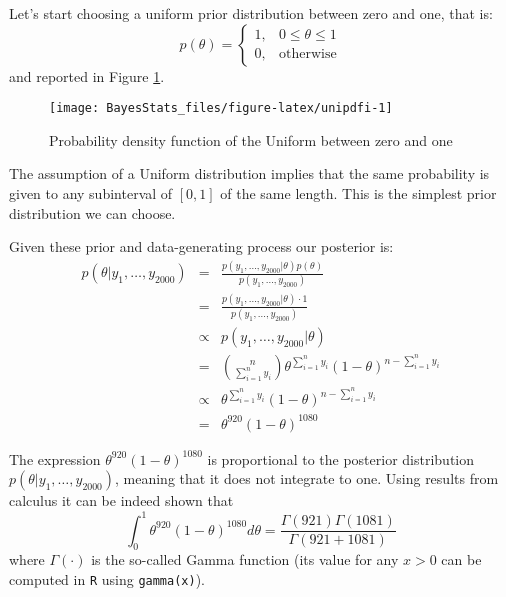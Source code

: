 \documentclass[
]{book}
\begin{document}
Let's start choosing a uniform prior distribution between zero and one, that is:
\[
p(\theta)=\left\{
\begin{array}{ll}
1, & 0\leq \theta \leq 1\\
0, & \mbox{otherwise}
\end{array}
\right.
\]
and reported in Figure \ref{fig:unipdfi}.

\begin{figure}

{\centering \texttt{[image: BayesStats\_files/figure-latex/unipdfi-1]} 

}

\caption{Probability density function of the Uniform between zero and one}\label{fig:unipdfi}
\end{figure}

The assumption of a Uniform distribution implies that the same probability is given to any subinterval of \([0,1]\) of the same length. This is the simplest prior distribution we can choose.

Given these prior and data-generating process our posterior is:
\begin{eqnarray*}
p(\theta|y_1,\dots,y_{2000}) &=&\frac{p(y_1,\dots,y_{2000}|\theta)p(\theta)}{p(y_1,\dots,y_{2000})}\\
&=&\frac{p(y_1,\dots,y_{2000}|\theta)\cdot 1}{p(y_1,\dots,y_{2000})}\\
&\propto&p(y_1,\dots,y_{2000}|\theta)\\
&=& \binom{n}{\sum_{i=1}^ny_i}\theta^{\sum_{i=1}^ny_i}(1-\theta)^{n-\sum_{i=1}^ny_i}\\
&\propto& \theta^{\sum_{i=1}^ny_i}(1-\theta)^{n-\sum_{i=1}^ny_i}\\
&=& \theta^{920}(1-\theta)^{1080}
\end{eqnarray*}

The expression \(\theta^{920}(1-\theta)^{1080}\) is proportional to the posterior distribution \(p(\theta|y_1,\dots,y_{2000})\), meaning that it does not integrate to one. Using results from calculus it can be indeed shown that
\[
\int_{0}^{1}\theta^{920}(1-\theta)^{1080}d\theta=\frac{\Gamma(921)\Gamma(1081)}{\Gamma(921 + 1081)}
\]
where \(\Gamma(\cdot)\) is the so-called Gamma function (its value for any \(x>0\) can be computed in \texttt{R} using \texttt{gamma(x)}).
\end{document}
